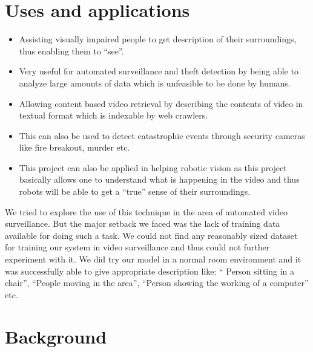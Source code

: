 \documentclass[12pt]{article}
\begin{document}
	\section{Uses and applications}
			\begin{itemize}
				\item
					Assisting visually impaired people to get description of their surroundings, thus enabling them to ``see''.
				\item
					Very useful for automated surveillance and theft detection by being able to analyze large amounts of data which is unfeasible to be done by humans.
				\item
					Allowing content based video retrieval by describing the contents of video in textual format which is indexable by web crawlers.
				\item
					This can also be used to detect catastrophic events through security cameras like fire breakout, murder etc.
				\item
					This project can also be applied in helping robotic vision as this project basically allows one to understand what is happening in the video and thus robots will be able to get a ``true'' sense of their surroundings.
			\end{itemize}
			We tried to explore the use of this technique in the area of automated video surveillance. But the major setback
			we faced was the lack of training data available for doing such a task. We could not find any reasonably sized
			dataset for training our system in video surveillance and thus could not further experiment with it. We did try
			our model in a normal room environment and it was successfully able to give appropriate description like: ``
			Person sitting in a chair'', ``People moving in the area'', ``Person showing the working of a computer'' etc.

	\section{Background} 
\end{document}
